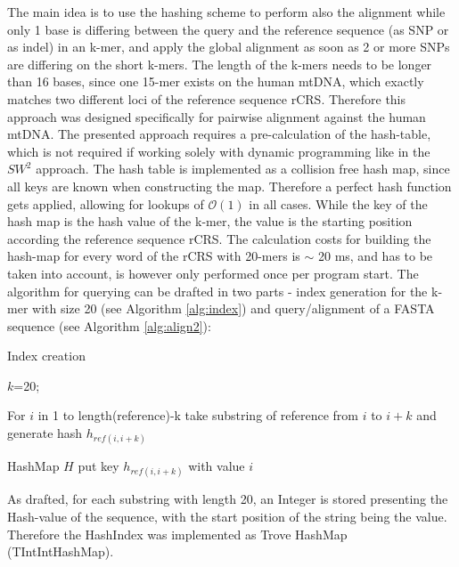 The main idea is to use the hashing scheme to perform also the alignment while only 1 base is differing between the query and the reference sequence (as SNP or as indel) in an k-mer, and apply the global alignment as soon as 2 or more SNPs are differing on the short k-mers. The length of the k-mers needs to be longer than 16 bases, since one 15-mer exists on the human mtDNA, which exactly matches two different loci of the reference sequence rCRS. Therefore this approach was designed specifically for pairwise alignment against the human mtDNA.
The presented approach requires a pre-calculation of the hash-table, which is not required if working solely with dynamic programming like in the $SW^{2}$ approach.
The hash table is implemented as a collision free hash map, since all keys are known when constructing the map. Therefore a perfect hash function gets applied, allowing for lookups of $\mathcal{O}(1)$ in all cases. While the key of the hash map is the hash value of the k-mer, the value is the starting position according the reference sequence rCRS. The calculation costs for building the hash-map for every word of the rCRS with 20-mers is $\sim$ 20 ms, and has to be taken into account, is however only performed once per program start.
The algorithm for querying can be drafted in two parts - index generation for the k-mer with size 20 (see Algorithm \ref{alg:index}) and query/alignment of a FASTA sequence (see Algorithm \ref{alg:align2}):

\begin{algorithm}
\caption{Index creation}
\label{alg:index}
$k$=20;

For $i$ in 1 to length(reference)-k take substring of reference from $i$ to $i+k$ and generate hash $h_{ref(i,i+k)}$

HashMap $H$ put key $h_{ref(i,i+k)}$ with value $i$ 
\end{algorithm}

As drafted, for each substring with length 20, an Integer is stored presenting the Hash-value of the sequence, with the start position of the string being the value. Therefore the HashIndex was implemented as Trove HashMap (TIntIntHashMap). 

